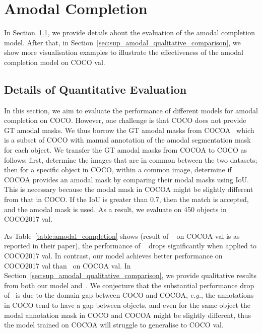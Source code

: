 \documentclass{bmvc2k}
\begin{document}
\section{Amodal Completion}
\label{sec:sup_amodal_completion}
In Section~\ref{sec:sup_amodal_quantitative}, we provide details about the evaluation of the amodal completion model. 
After that, in Section~\ref{sec:sup_amodal_qualitative_comparison}, we show more visualisation examples to illustrate the effectiveness of the amodal completion model on COCO val.


\subsection{Details of Quantitative Evaluation}
\label{sec:sup_amodal_quantitative}

In this section, we aim to evaluate the performance of different models for amodal completion on COCO. 
However, one challenge is that COCO does not provide GT amodal masks.
We thus borrow the GT amodal masks from COCOA~\cite{zhu2015cocoa} which is a subset of COCO with manual annotation of the amodal segmentation mask for each object. 
We transfer the GT amodal masks from COCOA to COCO as follows: first, determine the images that are in common between the two datasets; then for a specific object in COCO, within a common image,  determine if COCOA provides an amodal mask by comparing their modal masks using IoU. This is necessary because the modal mask in COCOA might be slightly different from that in COCO.  If the IoU is greater than 0.7, then the match is accepted, and the amodal mask is used.
As a result, we evaluate on 450 objects in COCO2017 val.


As Table~\ref{table:amodal_completion} shows (result of ~\cite{zhan2020self} on COCOA val is as reported in their paper), the performance of ~\cite{zhan2020self} drops significantly when applied to COCO2017 val. In contrast, our model achieves better performance on COCO2017 val than~\cite{zhan2020self} on COCOA val. 
In Section~\ref{sec:sup_amodal_qualitative_comparison}, 
we provide qualitative results from both our model and~\cite{zhan2020self}.
We conjecture that the substantial performance drop of~\cite{zhan2020self} is due to the domain gap between COCO and COCOA, {\em e.g.}, the annotations in COCO tend to have a gap between objects, and even for the same object the modal annotation mask in COCO and COCOA might be slightly different, thus the model trained on COCOA will struggle to generalise to COCO val.
\end{document}
